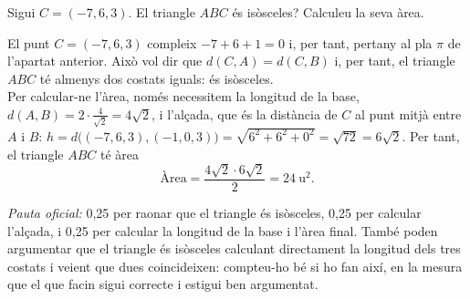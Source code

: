 \begin{apartats}
Sigui $C=(-7,6,3)$. El triangle $ABC$ és isòsceles? Calculeu la seva àrea.

\begin{solucio}
El punt $C=(-7,6,3)$ compleix $-7+6+1=0$ i, per tant, pertany al pla $\pi$ de l'apartat anterior. Això vol dir
que $d(C,A)=d(C,B)$ i, per tant, el triangle $ABC$ té almenys dos costats iguals: és isòsceles.\\
Per calcular-ne l'àrea, només necessitem la longitud de la base, $d(A,B)=2\cdot\frac{4}{\sqrt2}=4\sqrt2$, i
l'alçada, que és la distància de $C$ al punt mitjà entre $A$ i $B$:
$h=d\bigl((-7,6,3),(-1,0,3)\bigr)=\sqrt{6^2+6^2+0^2}=\sqrt{72}=6\sqrt2$. Per tant, el triangle $ABC$ té àrea
\[
\text{Àrea}=\frac{4\sqrt2\cdot6\sqrt2}{2}=24\ \text{u}^2 .
\]

\textit{Pauta oficial:} 0,25 per raonar que el triangle és isòsceles, 0,25 per calcular l'alçada, i 0,25 per
calcular la longitud de la base i l'àrea final. També poden argumentar que el triangle és isòsceles calculant
directament la longitud dels tres costats i veient que dues coincideixen: compteu-ho bé si ho fan així, en la
mesura que el que facin sigui correcte i estigui ben argumentat.
\end{solucio}

\end{apartats}
